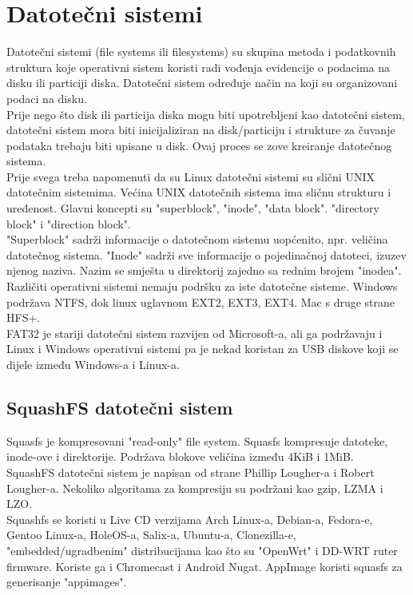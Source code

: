 \documentclass[12pt,vi]{mitthesis}
\begin{document}
\section*{Datotečni sistemi}
\indent
Datotečni sistemi (file systems ili filesystems) su skupina metoda i podatkovnih struktura koje operativni sistem koristi radi vođenja evidencije o podacima na disku ili particiji diska. Datotečni sistem određuje način na koji su organizovani podaci na disku.\\
Prije nego što disk ili particija diska mogu biti upotrebljeni kao datotečni sistem, datotečni sistem mora biti inicijaliziran na disk/particiju i strukture za čuvanje podataka trebaju biti upisane u disk. Ovaj proces se zove kreiranje datotečnog sistema.\\
Prije svega treba napomenuti da su Linux datotečni sistemi su slični UNIX datotečnim sistemima. Većina UNIX datotečnih sistema ima sličnu strukturu i uređenost. Glavni koncepti su "superblock", "inode", "data block". "directory block" i "direction block".\\
"Superblock" sadrži informacije o datotečnom sistemu uopćenito, npr. veličina datotečnog sistema. "Inode" sadrži sve informacije o pojedinačnoj datoteci, izuzev njenog naziva. Nazim se smješta u direktorij zajedno sa rednim brojem "inodea".
\\
Različiti operativni sistemi nemaju podršku za iste datotečne sisteme. Windows podržava NTFS, dok linux uglavnom EXT2, EXT3, EXT4. Mac s druge strane HFS+.\\
FAT32 je stariji datotečni sistem razvijen od Microsoft-a, ali ga podržavaju i Linux i Windows operativni sistemi pa je nekad koristan za USB diskove koji se dijele između Windows-a i Linux-a.
\subsection*{SquashFS datotečni sistem}
\indent
Squasfs je kompresovani "read-only" file system. Squasfs kompresuje datoteke, inode-ove i direktorije. Podržava blokove veličina između 4KiB i 1MiB.\\
\indent
SquashFS datotečni sistem je napisan od strane 	Phillip Lougher-a i Robert Lougher-a. 
Nekoliko algoritama za kompresiju su podržani kao gzip, LZMA i LZO.\\
Squashfs se koristi u Live CD verzijama Arch Linux-a, Debian-a, Fedora-e, Gentoo Linux-a, HoleOS-a, Salix-a, Ubuntu-a, Clonezilla-e, "embedded/ugradbenim" distribucijama kao što su "OpenWrt" i DD-WRT ruter firmware. Koriste ga i Chromecast i Android Nugat. AppImage koristi squasfs za generisanje "appimages".\\
\end{document}
